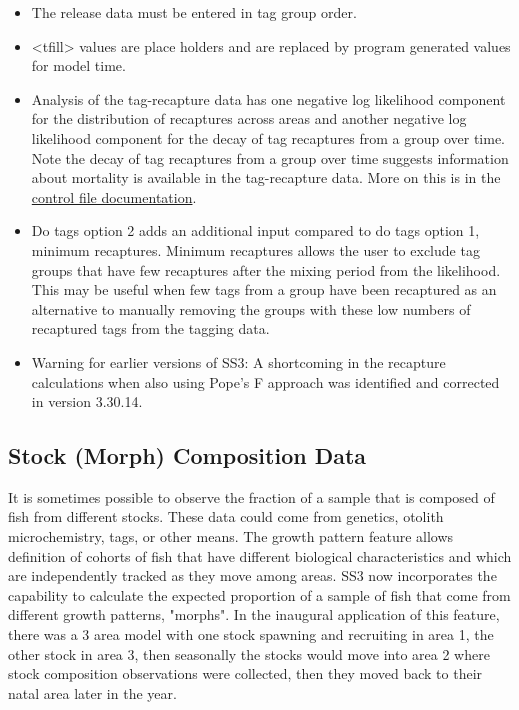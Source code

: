 	\begin{itemize}
		\item The release data must be entered in tag group order.
		\item <tfill> values are place holders and are replaced by program generated values for model time.
		\item Analysis of the tag-recapture data has one negative log likelihood component for the distribution of recaptures across areas and another negative log likelihood component for the decay of tag recaptures from a group over time. Note the decay of tag recaptures from a group over time suggests information about mortality is available in the tag-recapture data. More on this is in the \hyperlink{tagrecapture}{control file documentation}.
		\item  Do tags option 2 adds an additional input compared to do tags option 1, minimum recaptures. Minimum recaptures allows the user to exclude tag groups that have few recaptures after the mixing period from the likelihood. This may be useful when few tags from a group have been recaptured as an alternative to manually removing the groups with these low numbers of recaptured tags from the tagging data.
		\item Warning for earlier versions of SS3: A shortcoming in the recapture calculations when also using Pope's F approach was identified and corrected in version 3.30.14.
	\end{itemize}

\subsection{Stock (Morph) Composition Data}
It is sometimes possible to observe the fraction of a sample that is composed of fish from different stocks. These data could come from genetics, otolith microchemistry, tags, or other means.  The growth pattern feature allows definition of cohorts of fish that have different biological characteristics and which are independently tracked as they move among areas. SS3 now incorporates the capability to calculate the expected proportion of a sample of fish that come from different growth patterns, "morphs". In the inaugural application of this feature, there was a 3 area model with one stock spawning and recruiting in area 1, the other stock in area 3, then seasonally the stocks would move into area 2 where stock composition observations were collected, then they moved back to their natal area later in the year.

